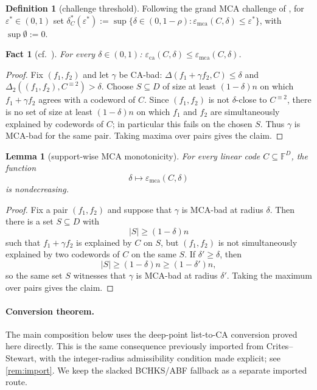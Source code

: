 \documentclass[11pt]{article}
\newtheorem{lemma}[theorem]{Lemma}
\newtheorem{fact}[theorem]{Fact}
\theoremstyle{definition}
\newtheorem{definition}[theorem]{Definition}
\theoremstyle{remark}
\newcommand{\F}{\mathbb{F}}
\newcommand{\eca}{\varepsilon_{\mathrm{ca}}}
\newcommand{\emca}{\varepsilon_{\mathrm{mca}}}
\newcommand{\dist}{\Delta}
\begin{document}
\begin{definition}[challenge threshold]\label{def:dstar}
Following the grand MCA challenge of \cite[\S1]{ABF26}, for $\varepsilon^*\in(0,1)$ set
$\delta^*_C(\varepsilon^*):=\sup\{\delta\in(0,1-\rho):\emca(C,\delta)\le\varepsilon^*\}$, with $\sup\emptyset:=0$.
\end{definition}

\begin{fact}[{cf.\ \cite[Fact~4.5]{ABF26}}]\label{fact:chain}
For every $\delta\in(0,1)$: $\eca(C,\delta)\le\emca(C,\delta)$.
\end{fact}

\begin{proof}
Fix $(f_1,f_2)$ and let $\gamma$ be CA-bad: $\dist(f_1+\gamma f_2,C)\le\delta$ and $\dist_2((f_1,f_2),C^{\equiv2})>\delta$. Choose $S\subseteq D$ of size at least $(1-\delta)n$ on which $f_1+\gamma f_2$ agrees with a codeword of $C$. Since $(f_1,f_2)$ is not $\delta$-close to $C^{\equiv2}$, there is no set of size at least $(1-\delta)n$ on which $f_1$ and $f_2$ are simultaneously explained by codewords of $C$; in particular this fails on the chosen $S$. Thus $\gamma$ is MCA-bad for the same pair. Taking maxima over pairs gives the claim.
\end{proof}

\begin{lemma}[support-wise MCA monotonicity]\label{lem:mca-monotone}
For every linear code $C\subseteq\F^D$, the function
\[
        \delta\longmapsto \emca(C,\delta)
\]
is nondecreasing.
\end{lemma}

\begin{proof}
Fix a pair $(f_1,f_2)$ and suppose that $\gamma$ is MCA-bad at radius $\delta$. Then there is a set $S\subseteq D$ with
\[
        |S|\ge (1-\delta)n
\]
such that $f_1+\gamma f_2$ is explained by $C$ on $S$, but $(f_1,f_2)$ is not simultaneously explained by two codewords of $C$ on the same $S$. If $\delta'\ge\delta$, then
\[
        |S|\ge (1-\delta)n\ge (1-\delta')n,
\]
so the same set $S$ witnesses that $\gamma$ is MCA-bad at radius $\delta'$. Taking the maximum over pairs gives the claim.
\end{proof}

\paragraph{Conversion theorem.} The main composition below uses the deep-point list-to-CA conversion proved here directly. This is the same consequence previously imported from Crites--Stewart, with the integer-radius admissibility condition made explicit; see \cref{rem:import}. We keep the slacked BCHKS/ABF fallback as a separate imported route.
\end{document}
